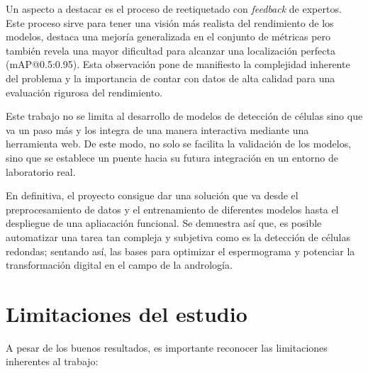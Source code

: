 \documentclass[12pt,a4paper,onecolumn,oneside]{report}
\begin{document}
Un aspecto a destacar es el proceso de reetiquetado con \textit{feedback} de expertos. Este proceso sirve para tener una visión más realista del rendimiento de los modelos, destaca una mejoría 
generalizada en el conjunto de métricas pero también revela una mayor dificultad para alcanzar una localización perfecta (mAP@0.5:0.95). Esta observación pone de manifiesto la complejidad inherente 
del problema y la importancia de contar con datos de alta calidad para una evaluación rigurosa del rendimiento.

Este trabajo no se limita al desarrollo de modelos de detección de células sino que va un paso más y los integra de una manera interactiva mediante una herramienta web. 
De este modo, no solo se facilita la validación de los modelos, sino que se establece un puente hacia su futura integración en un entorno de laboratorio real.

En definitiva, el proyecto consigue dar una solución que va desde el preprocesamiento de datos y el entrenamiento de diferentes modelos hasta el despliegue de una apliacación funcional. Se demuestra así que, es posible automatizar 
una tarea tan compleja y subjetiva como es la detección de células redondas; sentando así, las bases para optimizar el espermograma y potenciar la transformación digital en el campo de la andrología.

\section{Limitaciones del estudio}
\label{sec:Limitaciones del estudio}

A pesar de los buenos resultados, es importante reconocer las limitaciones inherentes al trabajo:
\end{document}
